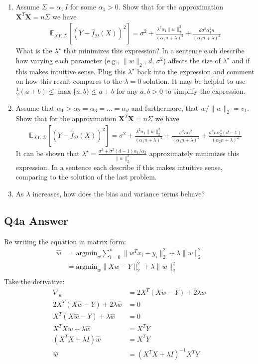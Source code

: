 \documentclass{article}
\newcommand{\1}{\mathbf{1}}
\def\E{\mathbb{E}}
\newcommand{\mb}[1]{\mathbf{#1}}
\newcommand{\mc}[1]{\mathcal{#1}}
\begin{document}
\begin{enumerate}
    \item Assume $\Sigma= \alpha_1 \, I$ for some $\alpha_1 >0$. Show that for the approximation $\mb{X}^T \mb{X} = n \Sigma$ we have
    \begin{align*}
    \E_{XY,\mc{D}}[ (Y-\widehat{f}_{\mc{D}}(X))^2] = \sigma^2 + \frac{\lambda^2 \alpha_1 \|w\|_2^2}{(\alpha_1 n+\lambda)^2} + \frac{d \sigma^2 \alpha_1^2 n}{(\alpha_1 n + \lambda)^2}
    \end{align*}
    What is the $\lambda^\star$ that minimizes this expression? 
    In a sentence each describe how varying each parameter (e.g., $\|w\|_2$, $d$, $\sigma^2$) affects the size of $\lambda^\star$ and if this makes intuitive sense.
    Plug this $\lambda^\star$ back into the expression and comment on how this result compares to the $\lambda=0$ solution. It may be helpful to use $\tfrac{1}{2}(a+b) \leq \max\{a,b\} \leq a+b$ for any $a,b>0$ to simplify the expression.  
    \item Assume that $\alpha_1 > \alpha_2 = \alpha_3 = \dots = \alpha_d$ and furthermore, that $w/\|w\|_2 = v_1$. Show that for the approximation $\mb{X}^T \mb{X} = n \Sigma$ we have
    \begin{align*}
    \E_{XY,\mc{D}}[ (Y-\widehat{f}_{\mc{D}}(X))^2] = \sigma^2 + \frac{\lambda^2 \alpha_1 \|w\|_2^2}{(\alpha_1 n+\lambda)^2} + \frac{\sigma^2 n \alpha_1^2}{(\alpha_1 n + \lambda)^2} + \frac{\sigma^2 n \alpha_2^2 (d-1)}{(\alpha_2 n + \lambda)^2}
    \end{align*}
    It can be shown that $\lambda^\star = \frac{\sigma^2 + \sigma^2(d-1)\alpha_1/\alpha_2}{\|w\|_2^2}$ approximately minimizes this expression. 
    In a sentence each describe if this makes intuitive sense, comparing to the solution of the last problem.
    \item As $\lambda$ increases, how does the bias and variance terms behave?
     
\end{enumerate}

\subsection{Q4a Answer}
Re writing the equation in matrix form:
\begin{align*}
\widehat{w} & = \text{argmin}_{w} \sum_{i=0}^{n} \| w^Tx_{i} - y_{i} \|^{2}_{2} + \lambda \|w\|_{2}^{2} \\
& = \text{argmin}_w \| X w - Y \|_2^2 + \lambda \|w\|_2^2 \\
\end{align*}
Take the derivative:
\begin{align*}
    \nabla_{w} & = 2 X^T(X w -Y) + 2 \lambda w \\
    2 X^T(X\widehat{w} -Y) + 2 \lambda \widehat{w} & = 0 \\
    X^T(X\widehat{w} -Y) + \lambda \widehat{w} & = 0 \\
    X^TX\widehat{w} + \lambda \widehat{w} & = X^T Y \\
    (X^TX + \lambda I ) \widehat{w} & = X^T Y \\
     \widehat{w} & =(X^TX + \lambda I )^{-1} X^T Y \\
\end{align*}
\end{document}
